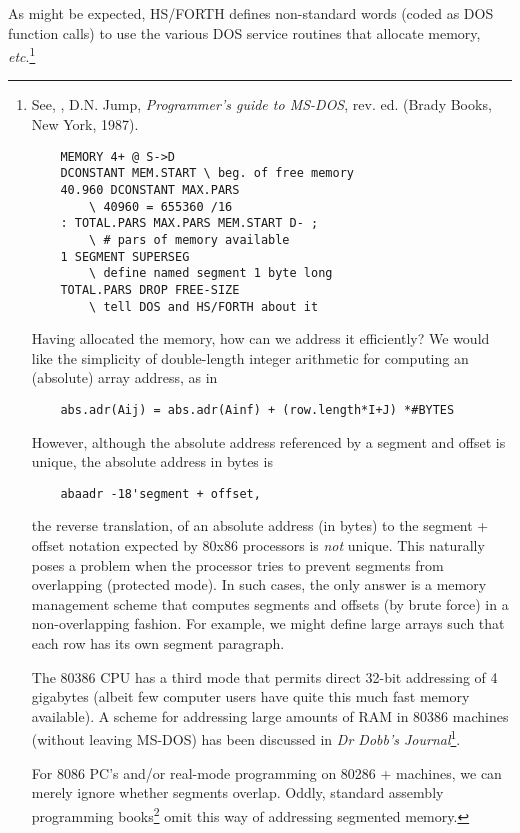 {{As might be expected, HS/FORTH defines non-standard words (coded as DOS function calls) to use the various DOS service routines that allocate memory, \textit{etc}.\footnote{See, \eg, D.N. Jump, \textit{Programmer's guide to MS-DOS}, rev. ed. (Brady Books, New York, 1987).

\begin{lstlisting}
    MEMORY 4+ @ S->D
    DCONSTANT MEM.START \ beg. of free memory
    40.960 DCONSTANT MAX.PARS
        \ 40960 = 655360 /16
    : TOTAL.PARS MAX.PARS MEM.START D- ;
        \ # pars of memory available
    1 SEGMENT SUPERSEG
        \ define named segment 1 byte long
    TOTAL.PARS DROP FREE-SIZE
        \ tell DOS and HS/FORTH about it
\end{lstlisting}

Having allocated the memory, how can we address it efficiently? We would like the simplicity of double-length integer arithmetic for computing an (absolute) array address, as in

\begin{lstlisting}
    abs.adr(Aij) = abs.adr(Ainf) + (row.length*I+J) *#BYTES
\end{lstlisting}

However, although the absolute address referenced by a segment and offset is unique, \ie the absolute address in bytes is

\begin{lstlisting}
    abaadr -18'segment + offset,
\end{lstlisting}

the reverse translation, of an absolute address (in bytes) to the segment + offset notation expected by 80x86 processors is \textit{not} unique. This naturally poses a problem when the processor tries to prevent segments from overlapping (protected mode). In such cases, the only answer is a memory management scheme that computes segments and offsets (by brute force) in a non-overlapping fashion. For example, we might define large arrays such that each row has its own segment paragraph.

The 80386 CPU has a third mode that permits direct 32-bit addressing of 4 gigabytes (albeit few computer users have quite this much fast memory available). A scheme for addressing large amounts of RAM in 80386 machines (without leaving MS-DOS) has been discussed in \textit{Dr Dobb's Journal}\footnote{See, \eg, Al Williams, "DOS + 386 = 4 Gigabytes", Dr. Dobb's Journal, July 1990, p. 62.}.

For 8086 PC's and/or real-mode programming on 80286 + machines, we can merely ignore whether segments overlap. Oddly, standard assembly programming books\footnote{C. Morph and M. Waite, \textit{8086/8088 16-bit microprocessor primer} (Byte/McGraw—Hill, Peterborough, 1982); L. Scanlon, \textit{IBM PC & XT assembly language: a guide for programmers} (Brady/Prentice-Hall, Bowie, Md., 1983); R. Lafore, \textit{Assembly language primer for the IBM PC & XT} (Plume/Waite, New York, 1984).} omit this way of addressing segmented memory.

}}}
